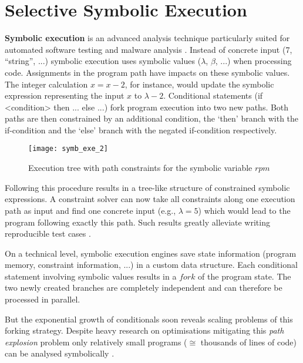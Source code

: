 \section{Selective Symbolic Execution}\label{sec:s2e}

\textbf{Symbolic execution} is an advanced analysis technique particularly suited for automated software testing  and malware analysis .
Instead of concrete input (7, ``string'', ...) symbolic execution uses symbolic values ($\lambda$, $\beta$, ...) when processing code.
Assignments in the program path have impacts on these symbolic values.
The integer calculation $x = x - 2$, for instance, would update the symbolic expression representing the input $x$ to $\lambda - 2$.
Conditional statements (if <condition> then ... else ...) fork program execution into two new paths.
Both paths are then constrained by an additional condition, the `then' branch with the if-condition and the `else' branch with the negated if-condition respectively.

\begin{figure}
\texttt{[image: symb\_exe\_2]}
\caption{Execution tree with path constraints for the symbolic variable $rpm$ \cite{chip14s2e}}
\label{fig:arch}
\end{figure}

Following this procedure results in a tree-like structure of constrained symbolic expressions.
A constraint solver can now take all constraints along one execution path as input and find one concrete input (e.g., $\lambda = 5$) which would lead to the program following exactly this path.
Such results greatly alleviate writing reproducible test cases \cite{chip09sel}.

On a technical level, symbolic execution engines save state information (program memory, constraint information, ...) in a custom data structure.
Each conditional statement involving symbolic values results in a $fork$ of the program state.
The two newly created branches are completely independent and can therefore be processed in parallel.

But the exponential growth of conditionals soon reveals scaling problems of this forking strategy.
Despite heavy research on optimisations mitigating this \textit{path explosion} problem  only relatively small programs ($\cong$ thousands of lines of code) can be analysed symbolically \cite{chip09sel}.

